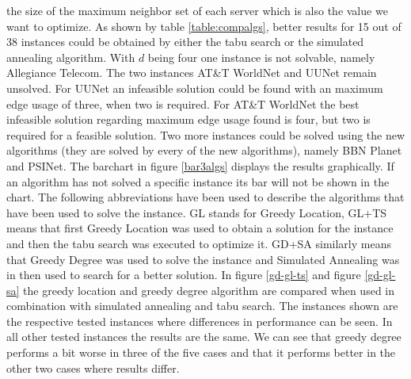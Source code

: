 \documentclass [12pt]{article}
\begin{document}
  the size of the maximum neighbor set of each server which is also the value we want to optimize. As shown by table \ref{table:compalgs}, better results for 15 out of 38 instances could be obtained 
  by either the tabu search or the simulated annealing algorithm. With $d$ being four one instance is not solvable, namely Allegiance Telecom. 
  The two instances AT\&T WorldNet and UUNet remain unsolved. For UUNet an infeasible solution could be found with an maximum edge usage of three, when two is required. 
  For AT\&T WorldNet the best infeasible solution regarding maximum edge usage found is four, but two is required for a feasible solution. 
  Two more instances could be solved using the new algorithms (they are solved by every of the new algorithms), namely BBN Planet and PSINet.
  The barchart in figure \ref{bar3algs} displays the results graphically. If an algorithm has not solved a specific instance its bar will not be shown in the chart.
  The following abbreviations have been used to describe the algorithms that have been used to solve the instance. GL stands for Greedy Location, GL+TS means that first Greedy Location was used 
  to obtain a solution for the instance and then the tabu search was executed to optimize it. GD+SA similarly means that Greedy Degree was used to solve the instance and Simulated Annealing was in then used
  to search for a better solution. In figure \ref{gd-gl-ts} and figure \ref{gd-gl-sa} the greedy location and greedy degree algorithm are compared when used in combination with simulated
  annealing and tabu search. The instances shown are the respective tested instances where differences in performance can be seen. In all other tested instances the results are the same. 
  We can see that greedy degree performs a bit worse in three of the five cases and that it performs better in the other two cases where results differ.
\end{document}
